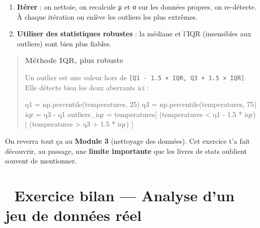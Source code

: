 \documentclass[
  french,
  11pt,
  a4paper,
]{scrbook}
\newenvironment{Shaded}{}{}
\newcommand{\DecValTok}[1]{\textcolor[rgb]{0.00,0.36,0.77}{#1}}
\newcommand{\FloatTok}[1]{\textcolor[rgb]{0.00,0.36,0.77}{#1}}
\newcommand{\NormalTok}[1]{\textcolor[rgb]{0.14,0.16,0.18}{#1}}
\newcommand{\OperatorTok}[1]{\textcolor[rgb]{0.14,0.16,0.18}{#1}}
\providecommand{\tightlist}{%
  \setlength{\itemsep}{0pt}\setlength{\parskip}{0pt}}
\begin{document}
\begin{tcolorbox}
\begin{enumerate}
\def\labelenumi{\arabic{enumi}.}
\tightlist
\item
  \textbf{Itérer} : on nettoie, on recalcule μ et σ sur les données
  propres, on re-détecte. À chaque itération on enlève les outliers les
  plus extrêmes.
\item
  \textbf{Utiliser des statistiques robustes} : la médiane et l'IQR
  (insensibles aux outliers) sont bien plus fiables.
\end{enumerate}

\begin{quote}
\textbf{Méthode IQR, plus robuste}

Un outlier est une valeur hors de
\texttt{{[}Q1\ -\ 1.5\ ×\ IQR,\ Q3\ +\ 1.5\ ×\ IQR{]}}. Elle détecte
bien les deux aberrants ici :

\begin{Shaded}
\begin{Highlighting}[]
\NormalTok{q1 }\OperatorTok{=}\NormalTok{ np.percentile(temperatures, }\DecValTok{25}\NormalTok{)}
\NormalTok{q3 }\OperatorTok{=}\NormalTok{ np.percentile(temperatures, }\DecValTok{75}\NormalTok{)}
\NormalTok{iqr }\OperatorTok{=}\NormalTok{ q3 }\OperatorTok{{-}}\NormalTok{ q1}
\NormalTok{outliers\_iqr }\OperatorTok{=}\NormalTok{ temperatures[}
\NormalTok{    (temperatures }\OperatorTok{\textless{}}\NormalTok{ q1 }\OperatorTok{{-}} \FloatTok{1.5} \OperatorTok{*}\NormalTok{ iqr) }\OperatorTok{|}\NormalTok{ (temperatures }\OperatorTok{\textgreater{}}\NormalTok{ q3 }\OperatorTok{+} \FloatTok{1.5} \OperatorTok{*}\NormalTok{ iqr)}
\NormalTok{]}
\end{Highlighting}
\end{Shaded}
\end{quote}

On reverra tout ça au \textbf{Module 3} (nettoyage des données). Cet
exercice t'a fait découvrir, au passage, une \textbf{limite importante}
que les livres de stats oublient souvent de mentionner.

\end{tcolorbox}

\chapter{🏁 Exercice bilan --- Analyse d'un jeu de données
réel}\label{exercice-bilan-analyse-dun-jeu-de-donnuxe9es-ruxe9el}
\end{document}
